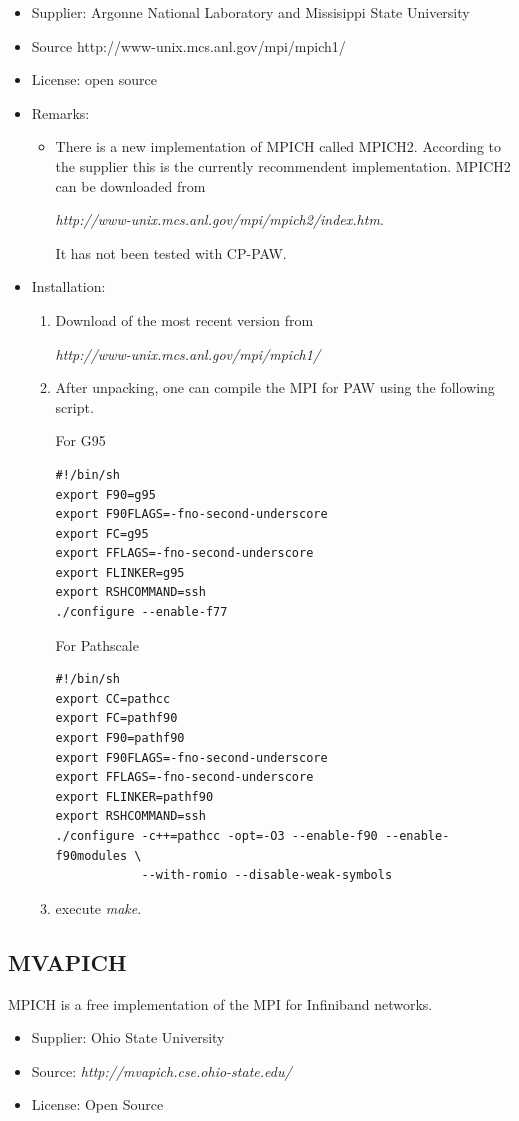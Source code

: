 \documentclass[a4paper,10pt]{report}
\begin{document}
\begin{itemize}
\item Supplier: Argonne National Laboratory and Missisippi State University
\item Source http://www-unix.mcs.anl.gov/mpi/mpich1/
\item License: open source
\item Remarks:
\begin{itemize}
\item There is a new implementation of MPICH called MPICH2. According
to the supplier this is the currently recommendent implementation.
MPICH2 can be downloaded from\\
\centerline{\textit{http://www-unix.mcs.anl.gov/mpi/mpich2/index.htm}.}
It has not been tested with CP-PAW.
\end{itemize}
\item Installation:
\begin{enumerate}
\item Download of the most recent version from
\begin{center}
\textit{http://www-unix.mcs.anl.gov/mpi/mpich1/}
\end{center}
\item After unpacking, one can compile the MPI for PAW using the 
following script.

For G95
\begin{verbatim}
#!/bin/sh
export F90=g95
export F90FLAGS=-fno-second-underscore
export FC=g95
export FFLAGS=-fno-second-underscore
export FLINKER=g95
export RSHCOMMAND=ssh
./configure --enable-f77
\end{verbatim}
For Pathscale
\begin{verbatim}
#!/bin/sh
export CC=pathcc
export FC=pathf90 
export F90=pathf90 
export F90FLAGS=-fno-second-underscore 
export FFLAGS=-fno-second-underscore
export FLINKER=pathf90
export RSHCOMMAND=ssh
./configure -c++=pathcc -opt=-O3 --enable-f90 --enable-f90modules \
            --with-romio --disable-weak-symbols 
\end{verbatim}

\item execute \textit{make}.
\end{enumerate}
\end{itemize}

\subsection{MVAPICH}
\label{sec:mvapich}
MPICH is a free implementation of the MPI for  Infiniband networks.
\begin{itemize}
\item Supplier: Ohio State University
\item Source: \textit{http://mvapich.cse.ohio-state.edu/}
\item License: Open Source
\end{itemize}
\end{document}
